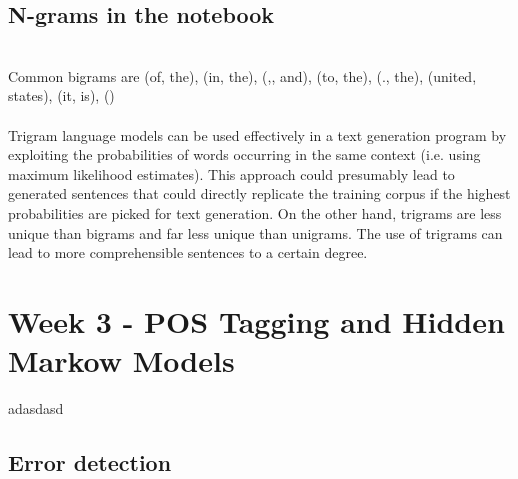 \documentclass[a4paper, 11pt]{article}
\begin{document}
\subsection{N-grams in the notebook}

\noindent{}\\

Common bigrams are (of, the), (in, the), (,, and), (to, the), (., the), (united, states), (it, is), ()\\

\noindent{}\\

Trigram language models can be used effectively in a text generation program by exploiting the probabilities of words occurring in the same context (i.e. using maximum likelihood estimates). This approach could presumably lead to generated sentences that could directly replicate the training corpus if the highest probabilities are picked for text generation. On the other hand, trigrams are less unique than bigrams and far less unique than unigrams. The use of trigrams can lead to more comprehensible sentences to a certain degree.

\section{Week 3 - POS Tagging and Hidden Markow Models}

adasdasd

\subsection{Error detection}

\noindent{}\\
\end{document}
